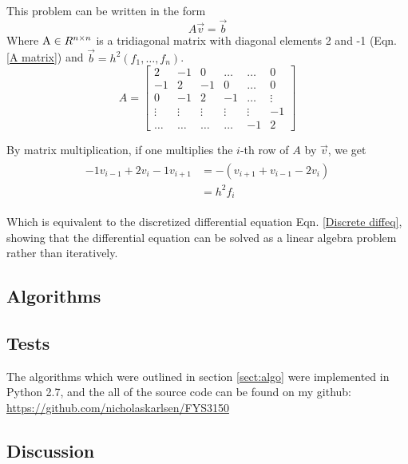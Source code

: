 \documentclass[11pt,a4paper, twocolumn]{article}
\begin{document}
  This problem can be written in the form 
  \begin{equation}
    A\vec v = \vec b
  \end{equation}
  Where $\textup A \in R^{n \times n}$ is a tridiagonal matrix with diagonal elements 2 and -1 (Eqn. \ref{A matrix}) and $\vec b =h^2(f_1, \dots, f_n)$.
  \begin{equation}
    \label{A matrix}
    A = \left[ 
    \begin{matrix}
      2 & -1 & 0 & \dots  & \dots &0 \\
      -1 & 2 & -1 & 0 & \dots &  0 \\
      0 & -1 & 2 & -1 & \dots & \vdots  \\
      \vdots & \vdots & \vdots & \vdots & \vdots & -1\\
      \dots & \dots & \dots & \dots & -1 & 2
    \end{matrix}
    \right]
  \end{equation}

  By matrix multiplication, if one multiplies the $i$-th row of $A$ by $\vec v$, we get
  \begin{align}
  \begin{split}
 -1 v_{i -1} + 2v_i - 1v_{i+1}  &= -\left( v_{i+1} + v_{i-1} - 2v_i\right) 
                                \\&= h^2f_i
  \end{split}
  \end{align}

  Which is equivalent to the discretized differential equation Eqn. \ref{Discrete diffeq},
  showing that the differential equation can be solved as a linear algebra problem rather than iteratively.

  \subsection{Algorithms \label{sect:algo}}

  \subsection{Tests}
    The algorithms which were outlined in section \ref{sect:algo} were implemented in Python 2.7, and the all of the source code can be found on my github: \url{https://github.com/nicholaskarlsen/FYS3150}

  \subsection{Discussion}
\end{document}
